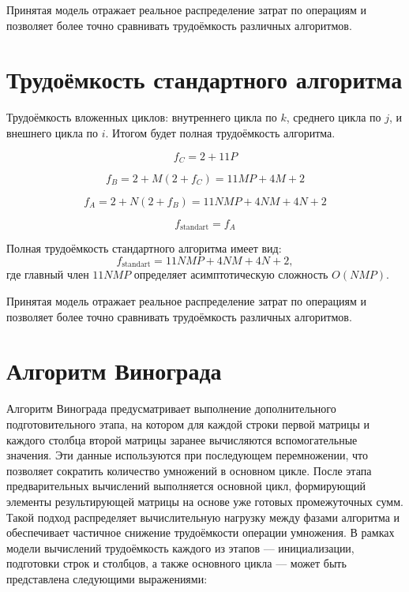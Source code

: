 Принятая модель отражает реальное распределение затрат по операциям и позволяет более точно сравнивать трудоёмкость различных алгоритмов.

\section{Трудоёмкость стандартного алгоритма}
Трудоёмкость вложенных циклов:  
внутреннего цикла по $k$, среднего цикла по $j$, 
и внешнего цикла по $i$. Итогом будет полная трудоёмкость алгоритма.

\begin{equation}
	f_C = 2 + 11P
\end{equation}

\begin{equation}
	f_B = 2 + M(2 + f_C) = 11MP + 4M + 2
\end{equation}

\begin{equation}
	f_A = 2 + N(2 + f_B) = 11NMP + 4NM + 4N + 2
\end{equation}

\begin{equation}
	f_{\text{standart}} = f_A
\end{equation}

Полная трудоёмкость стандартного алгоритма имеет вид:
\begin{equation}
	f_{\text{standart}} = 11NMP + 4NM + 4N + 2,
\end{equation}
где главный член $11NMP$ определяет асимптотическую сложность $O(NMP)$.

Принятая модель отражает реальное распределение затрат по операциям и позволяет более точно сравнивать трудоёмкость различных алгоритмов.

\section{Алгоритм Винограда}

Алгоритм Винограда предусматривает выполнение дополнительного подготовительного этапа, на котором для каждой строки первой матрицы и каждого столбца второй матрицы заранее вычисляются вспомогательные значения. Эти данные используются при последующем перемножении, что позволяет сократить количество умножений в основном цикле. После этапа предварительных вычислений выполняется основной цикл, формирующий элементы результирующей матрицы на основе уже готовых промежуточных сумм.
Такой подход распределяет вычислительную нагрузку между фазами алгоритма и обеспечивает частичное снижение трудоёмкости операции умножения. В рамках модели вычислений трудоёмкость каждого из этапов — инициализации, подготовки строк и столбцов, а также основного цикла — может быть представлена следующими выражениями:

